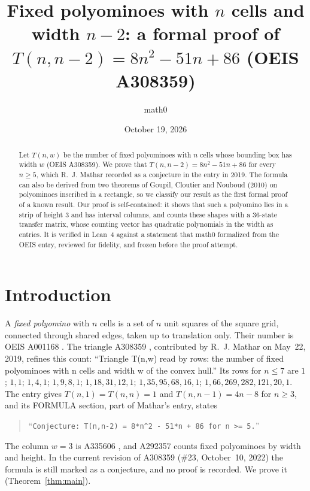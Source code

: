 \documentclass[11pt]{amsart}
\title[Fixed polyominoes with $n$ cells and width $n-2$]{Fixed polyominoes with $n$ cells and width $n-2$: a formal proof of $T(n,n-2)=8n^2-51n+86$ (OEIS A308359)}
\author{math0}
\date{October 19, 2026}
\theoremstyle{plain}
\theoremstyle{definition}
\begin{document}
\begin{abstract}
Let $T(n,w)$ be the number of fixed polyominoes with $n$ cells whose bounding box has width $w$ (OEIS A308359). We prove that $T(n,n-2)=8n^2-51n+86$ for every $n\ge5$, which R.~J. Mathar recorded as a conjecture in the entry in 2019. The formula can also be derived from two theorems of Goupil, Cloutier and Nouboud (2010) on polyominoes inscribed in a rectangle, so we classify our result as the first formal proof of a known result. Our proof is self-contained: it shows that such a polyomino lies in a strip of height $3$ and has interval columns, and counts these shapes with a $36$-state transfer matrix, whose counting vector has quadratic polynomials in the width as entries. It is verified in Lean~4 against a statement that math0 formalized from the OEIS entry, reviewed for fidelity, and frozen before the proof attempt.
\end{abstract}
\maketitle

\section{Introduction}

A \emph{fixed polyomino} with $n$ cells is a set of $n$ unit squares of the square grid, connected through shared edges, taken up to translation only. Their number is OEIS A001168 \cite{A001168}. The triangle A308359 \cite{A308359}, contributed by R.~J. Mathar on May~22, 2019, refines this count: ``Triangle T(n,w) read by rows: the number of fixed polyominoes with n cells and width w of the convex hull.'' Its rows for $n\le7$ are $1$; $1,1$; $1,4,1$; $1,9,8,1$; $1,18,31,12,1$; $1,35,95,68,16,1$; $1,66,269,282,121,20,1$. The entry gives $T(n,1)=T(n,n)=1$ and $T(n,n-1)=4n-8$ for $n\ge3$, and its FORMULA section, part of Mathar's entry, states
\begin{quote}
``\verb|Conjecture: T(n,n-2) = 8*n^2 - 51*n + 86 for n >= 5.|''
\end{quote}
The column $w=3$ is A335606 \cite{A335606}, and A292357 \cite{A292357} counts fixed polyominoes by width and height. In the current revision of A308359 (\#23, October~10, 2022) the formula is still marked as a conjecture, and no proof is recorded. We prove it (Theorem~\ref{thm:main}).
\end{document}
